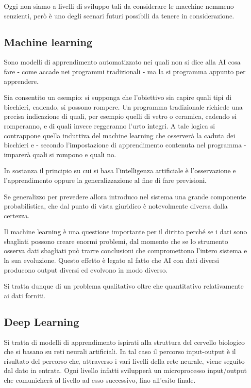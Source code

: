 Oggi non siamo a livelli di sviluppo tali da considerare le macchine nemmeno senzienti, però è uno degli scenari futuri possibili da tenere in considerazione. 

\subsection{Machine learning}
Sono modelli di apprendimento automatizzato nei quali non si dice alla AI cosa fare - come accade nei programmi tradizionali - ma la si programma appunto per apprendere.

Sia consentito un esempio: si supponga che l’obiettivo sia capire quali tipi di bicchieri, cadendo, si possono rompere. 
Un programma tradizionale richiede una precisa indicazione di quali, per esempio quelli di vetro o ceramica, cadendo si romperanno, e di quali invece reggeranno l’urto integri. 
A tale logica si contrappone quella induttiva del machine learning che osserverà la caduta dei bicchieri e - secondo l’impostazione di apprendimento contenuta nel programma - imparerà quali si rompono e quali no.

In sostanza il principio su cui si basa l'intelligenza artificiale è l'osservazione e l'apprendimento oppure la generalizzazione al fine di fare previsioni. 

Se generalizzo per prevedere allora introduco nel sistema una grande componente probabilistica, che dal punto di vista giuridico è notevolmente diversa dalla certezza.

Il machine learning è una questione importante per il diritto perché se i dati sono sbagliati possono creare enormi problemi, dal momento che se lo strumento osserva dati sbagliati può trarre conclusioni che compromettono l'intero sistema e la sua evoluzione.
Questo effetto è legato al fatto che AI con dati diversi producono output diversi ed evolvono in modo diverso. 

Si tratta dunque di un problema qualitativo oltre che quantitativo relativamente ai dati forniti.

\subsection{Deep Learning}
Si tratta di modelli di apprendimento ispirati alla struttura del cervello biologico che si basano su reti neurali artificiali. 
In tal caso il percorso input-output è il risultato del percorso che, attraverso i vari livelli della rete neurale, viene seguito dal dato in entrata. 
Ogni livello infatti svilupperà un microprocesso input/output che comunicherà al livello ad esso successivo, fino all’esito finale.

